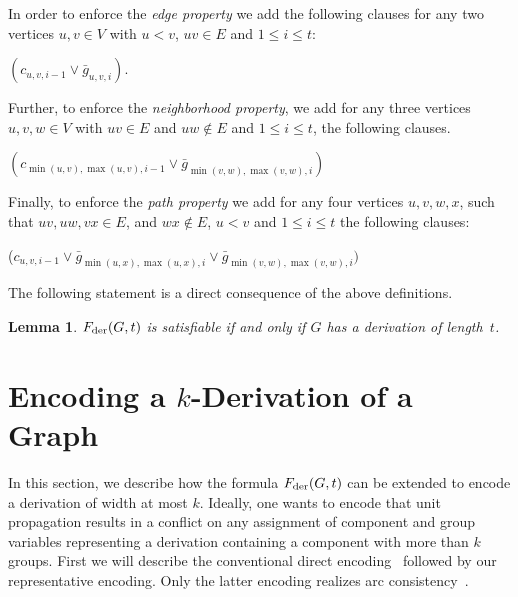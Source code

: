 \documentclass[10pt,usletter]{article}
\newenvironment{myquote}{\begin{center}
    \begin{minipage}{.80\linewidth}}{\end{minipage}\end{center}}
\newtheorem{lemma}{Lemma}
\theoremstyle{remark}
\newcommand{\hy}{\hbox{-}\nobreak\hskip0pt}
\newcommand{\Fder}{F_{\text{\normalfont der}}}
\begin{document}
\noindent In order to enforce the \emph{edge property} we add the
following clauses for any two vertices $u,v\in V$ with 
$u<v$, 
$uv\in E$ and
$1\leq i \leq t$:
\begin{myquote}
  $(c_{u,v,i-1} \lor \bar g_{u,v,i})$.
\end{myquote}
Further, to enforce the \emph{neighborhood property}, we add for any
three vertices $u,v,w\in V$ with $uv \in E$ and $uw \notin E$ and
$1\leq i \leq t$, the following clauses.
\begin{myquote}
  $(c_{\min(u,v),\max(u,v),i-1} \lor \bar g_{\min(v,w),\max(v,w),i})$ 





\end{myquote}
Finally, to enforce the \emph{path property} we add for any four
vertices $u,v,w,x$, such that  $uv, uw, vx \in E$, and $wx \notin E$, $u < v$
and $1\leq i \leq t$ 
the following clauses:
\begin{myquote}
  ($c_{u,v,i-1} \lor \bar g_{\min(u,x),\max(u,x),i} \lor \bar g_{\min(v,w),\max(v,w),i})$ 





\end{myquote}

\medskip\noindent
The following statement is a direct consequence of the above
definitions.
\begin{lemma}\label{lem:der}
  $\Fder(G,t)$ is satisfiable if and only if $G$ has a derivation of
  length~$t$.
\end{lemma}

\section{Encoding a $k$\hy Derivation of a Graph}

In this section, we describe how the formula $\Fder(G,t)$ can be
extended to encode a derivation of width at most $k$.  Ideally, one
wants to encode that unit propagation results in a conflict on any
assignment of component and group variables representing a derivation
containing a component with more than $k$ groups.  First we will
describe the conventional direct encoding~\cite{Walsh00} followed by
our representative encoding. Only the latter encoding realizes arc consistency~\cite{Gent02}.
\end{document}
